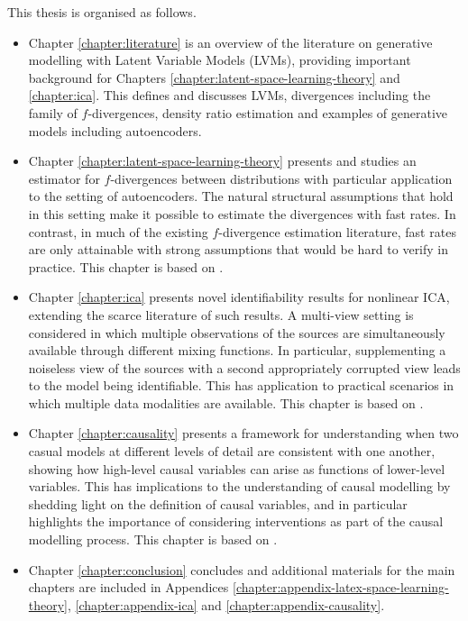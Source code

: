 This thesis is organised as follows.

\begin{itemize}
\item Chapter \ref{chapter:literature} is an overview of the literature on generative modelling with Latent Variable Models (LVMs), providing important background for Chapters \ref{chapter:latent-space-learning-theory} and \ref{chapter:ica}. 
This defines and discusses LVMs, divergences including the family of $f$-divergences, density ratio estimation and examples of generative models including autoencoders.
\item Chapter \ref{chapter:latent-space-learning-theory} presents and studies an estimator for $f$-divergences between distributions with particular application to the setting of autoencoders. 
The natural structural assumptions that hold in this setting make it possible to estimate the divergences with fast rates.
In contrast, in much of the existing $f$-divergence estimation literature, fast rates are only attainable with strong assumptions that would be hard to verify in practice.
This chapter is based on \cite{rubenstein2019practical}.
\item Chapter \ref{chapter:ica} presents novel identifiability results for nonlinear ICA, extending the scarce literature of such results. 
A multi-view setting is considered in which multiple observations of the sources are simultaneously available through different mixing functions.
In particular, supplementing a noiseless view of the sources with a second appropriately corrupted view leads to the model being identifiable.
This has application to practical scenarios in which multiple data modalities are available.
This chapter is based on \cite{gresele2019incomplete}.
\item Chapter \ref{chapter:causality} presents a framework for understanding when two casual models at different levels of detail are consistent with one another, showing how high-level causal variables can arise as functions of lower-level variables.
This has implications to the understanding of causal modelling by shedding light on the definition of causal variables, and in particular highlights the importance of considering interventions as part of the causal modelling process.
This chapter is based on \cite{rubenstein2017causal}.
\item Chapter \ref{chapter:conclusion} concludes and additional materials for the main chapters are included in Appendices \ref{chapter:appendix-latex-space-learning-theory}, \ref{chapter:appendix-ica} and \ref{chapter:appendix-causality}.
\end{itemize}

